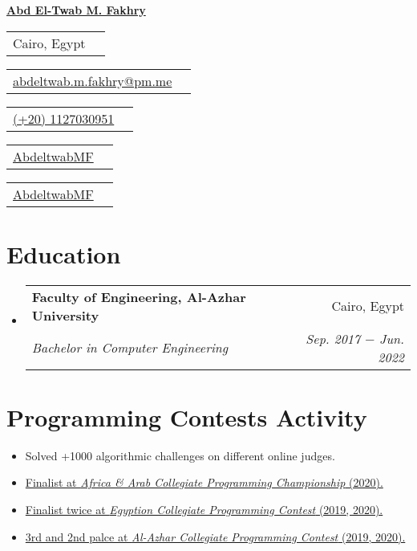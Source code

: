 \documentclass[letterpaper, 11pt]{article}
\makeatletter
\newcommand{\infoItem}[3] {
  \begin{tabular}{lr}
    {\color{#1}\faIcon{#2} {#3}}
  \end{tabular}
}
\newcommand{\educationItem}[4] {
  \vspace{-1pt}\item
  \begin{tabular*}{0.97\textwidth}[t]{l@{\extracolsep{\fill}}r}
    \textbf{#1} & #2 \\
    \textit{\small #3} & \textit{\small #4} \\
  \end{tabular*}\vspace{-5pt}
}
\newcommand{\progContItem}[1] {\item\small{#1 \vspace{-2pt}}}
\makeatother
\begin{document}
\href{www.twitter.com/AbdeltwabMF}{\textbf{{\Huge Abd El-Twab M. Fakhry}}} \\[2pt]

\begin{minipage}[t]{0.155\textwidth}
  \infoItem{RedViolet}{location-arrow}{Cairo, Egypt}
\end{minipage}
\begin{minipage}[t]{0.295\textwidth}
  \infoItem{RoyalPurple}{envelope}{\href{mailto:abdeltwab.m.fakhry@protonmail.com}{abdeltwab.m.fakhry@pm.me}}
\end{minipage}
\begin{minipage}[t]{0.19\textwidth}
  \infoItem{JungleGreen}{mobile-alt}{\href{tel:+201127030951}{(+20) 1127030951}}
\end{minipage}
\begin{minipage}[t]{0.165\textwidth}
  \infoItem{RoyalBlue}{linkedin}{\href{https://www.linkedin.com/in/abdeltwabmf/}{AbdeltwabMF}}
\end{minipage}
\begin{minipage}[t]{0.165\textwidth}
  \infoItem{Black}{github}{\href{https://github.com/AbdeltwabMF}{AbdeltwabMF}}
\end{minipage}

\section{Education}
\begin{itemize}[leftmargin=*]
  \educationItem{\faIcon{university} Faculty of Engineering, Al-Azhar University}{Cairo, Egypt}{Bachelor in Computer Engineering}{Sep. 2017 $-$ Jun. 2022}
\end{itemize}

\section{Programming Contests Activity}
\begin{itemize}[leftmargin=*]
  \progContItem{Solved +1000 algorithmic challenges on different online judges.}
  \progContItem{\href{https://icpc.global/ICPCID/S6R4YNB7PW7D}{Finalist at \emph{Africa \& Arab Collegiate Programming Championship} (2020).}}
  \progContItem{\href{https://icpc.global/ICPCID/S6R4YNB7PW7D}{Finalist twice at \emph{Egyption Collegiate Programming Contest} (2019, 2020).}}
  \progContItem{\href{https://icpc.global/ICPCID/S6R4YNB7PW7D}{3rd and 2nd palce at \emph{Al-Azhar Collegiate Programming Contest} (2019, 2020).}}
\end{itemize}
\end{document}
